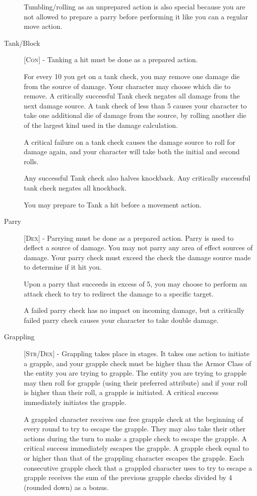 \begin{description}
Tumbling/rolling as an unprepared action is also special because you are not allowed to prepare a parry before performing it like you can a regular move action.

\item[Tank/Block] [\textsc{Con}] - Tanking a hit must be done as a prepared action.

For every 10 you get on a tank check, you may remove one damage die from the source of damage. Your character may choose which die to remove. A critically successful Tank check negates all damage from the next damage source. A tank check of less than 5 causes your character to take one additional die of damage from the source, by rolling another die of the largest kind used in the damage calculation.

A critical failure on a tank check causes the damage source to roll for damage again, and your character will take both the initial and second rolls.

Any successful Tank check also halves knockback. Any critically successful tank check negates all knockback.

You may prepare to Tank a hit before a movement action.

\item[Parry] [\textsc{Dex}] - Parrying must be done as a prepared action. Parry is used to deflect a source of damage. You may not parry any area of effect sources of damage. Your parry check must exceed the check the damage source made to determine if it hit you.

Upon a parry that succeeds in excess of 5, you may choose to perform an attack check to try to redirect the damage to a specific target.

A failed parry check has no impact on incoming damage, but a critically failed parry check causes your character to take double damage.

\item[Grappling] [\textsc{Str}/\textsc{Dex}] - Grappling takes place in stages. It takes one action to initiate a grapple, and your grapple check must be higher than the Armor Class of the entity you are trying to grapple. The entity you are trying to grapple may then roll for grapple (using their preferred attribute) and if your roll is higher than their roll, a grapple is initiated. A critical success immediately initiates the grapple.

A grappled character receives one free grapple check at the beginning of every round to try to escape the grapple. They may also take their other actions during the turn to make a grapple check to escape the grapple. A critical success immediately escapes the grapple. A grapple check equal to or higher than that of the grappling character escapes the grapple. Each consecutive grapple check that a grappled character uses to try to escape a grapple receives the sum of the previous grapple checks divided by 4 (rounded down) as a bonus.


\end{description}
